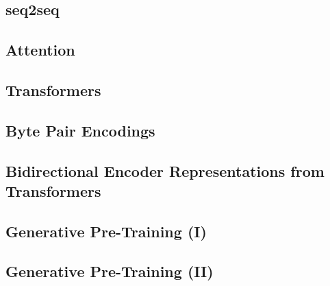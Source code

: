 \subsection{seq2seq}\label{sec:language-models:seq2seq}

\subsection{Attention}\label{sec:language-models:attention}
\subsection{Transformers}\label{sec:language-models:transformers}
\subsection{Byte Pair Encodings}\label{sec:language-models:bpe}

\subsection{Bidirectional Encoder Representations from Transformers}\label{sec:language-models:bert}
\subsection{Generative Pre-Training (I)}\label{sec:language-models:gpt}
\subsection{Generative Pre-Training (II)}\label{sec:language-models:gpt-2}
